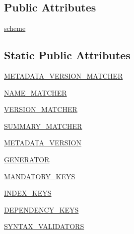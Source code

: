\subsection*{Public Attributes}
\begin{DoxyCompactItemize}
\item 
\hyperlink{classpip_1_1__vendor_1_1distlib_1_1metadata_1_1Metadata_ad7c506d0aff98490bb2f43d675be68af}{scheme}
\end{DoxyCompactItemize}
\subsection*{Static Public Attributes}
\begin{DoxyCompactItemize}
\item 
\hyperlink{classpip_1_1__vendor_1_1distlib_1_1metadata_1_1Metadata_aea1f900a68695db926bb5d013d911edd}{M\+E\+T\+A\+D\+A\+T\+A\+\_\+\+V\+E\+R\+S\+I\+O\+N\+\_\+\+M\+A\+T\+C\+H\+ER}
\item 
\hyperlink{classpip_1_1__vendor_1_1distlib_1_1metadata_1_1Metadata_a6284812143d9ece9100f8095b32073b3}{N\+A\+M\+E\+\_\+\+M\+A\+T\+C\+H\+ER}
\item 
\hyperlink{classpip_1_1__vendor_1_1distlib_1_1metadata_1_1Metadata_a5e39884a418be2d8684ebf2b8ec1ba0e}{V\+E\+R\+S\+I\+O\+N\+\_\+\+M\+A\+T\+C\+H\+ER}
\item 
\hyperlink{classpip_1_1__vendor_1_1distlib_1_1metadata_1_1Metadata_a41293cb0ee2878b67956a9c0966a62e8}{S\+U\+M\+M\+A\+R\+Y\+\_\+\+M\+A\+T\+C\+H\+ER}
\item 
\hyperlink{classpip_1_1__vendor_1_1distlib_1_1metadata_1_1Metadata_ac918cef5aff12d3c72c79f40f1c248fd}{M\+E\+T\+A\+D\+A\+T\+A\+\_\+\+V\+E\+R\+S\+I\+ON}
\item 
\hyperlink{classpip_1_1__vendor_1_1distlib_1_1metadata_1_1Metadata_a8f71000d5a93b0d2b6ec778972a00a5d}{G\+E\+N\+E\+R\+A\+T\+OR}
\item 
\hyperlink{classpip_1_1__vendor_1_1distlib_1_1metadata_1_1Metadata_adefca9472cc72d81b0f3af7b8ede2490}{M\+A\+N\+D\+A\+T\+O\+R\+Y\+\_\+\+K\+E\+YS}
\item 
\hyperlink{classpip_1_1__vendor_1_1distlib_1_1metadata_1_1Metadata_ac374147c5061bd0b263e2ea9bfdaf559}{I\+N\+D\+E\+X\+\_\+\+K\+E\+YS}
\item 
\hyperlink{classpip_1_1__vendor_1_1distlib_1_1metadata_1_1Metadata_ada3464c8bfcd96470d33dc85db0b91cc}{D\+E\+P\+E\+N\+D\+E\+N\+C\+Y\+\_\+\+K\+E\+YS}
\item 
\hyperlink{classpip_1_1__vendor_1_1distlib_1_1metadata_1_1Metadata_a9204a0ef535ac9b9ef35e77fe4d95f6b}{S\+Y\+N\+T\+A\+X\+\_\+\+V\+A\+L\+I\+D\+A\+T\+O\+RS}

\end{DoxyCompactItemize}
